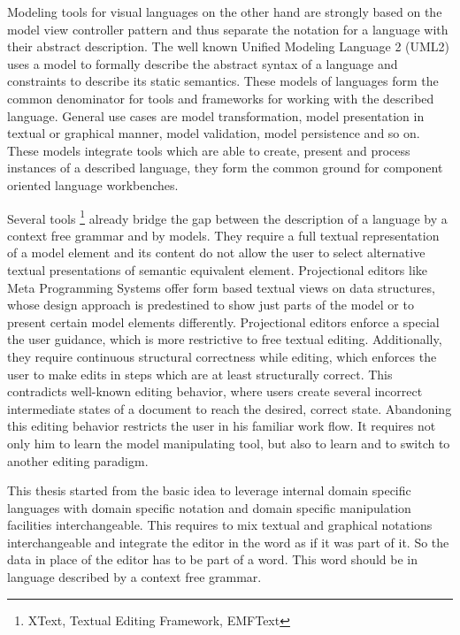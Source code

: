 Modeling tools for visual languages on the other hand are strongly based on the model view controller pattern and thus separate the notation for a language with their abstract description. The well known Unified Modeling Language 2 (UML2) uses a model to formally describe the abstract syntax of a language and constraints to describe its static semantics. These models of languages form the common denominator for tools and frameworks for working with the described language. General use cases are model transformation, model presentation in textual or graphical manner, model validation, model persistence and so on. These models integrate tools which are able to create, present and process instances of a described language, they form the common ground for component oriented language workbenches. 

Several tools \footnote{\raggedright XText, Textual Editing Framework, EMFText} already bridge the gap between the description of a language by a context free grammar and by models. They require a full textual representation of a model element and its content do not allow the user to select alternative textual presentations of semantic equivalent element. Projectional editors like Meta Programming Systems offer form based textual views on data structures, whose design approach is 	 predestined to show just parts of the model or to present certain model elements differently. Projectional editors enforce a special the user guidance, which is more restrictive to free textual editing. Additionally, they require continuous structural correctness while editing, which enforces the user to make edits in steps which are at least structurally correct. This contradicts well-known editing behavior, where users create several incorrect intermediate states of a document to reach the desired, correct state. Abandoning this editing behavior restricts the user in his familiar work flow. It requires not only him to learn the model manipulating tool, but also to learn and to switch to another editing paradigm. 

This thesis started from the basic idea to leverage internal domain specific languages with domain specific notation and domain specific manipulation facilities interchangeable. This requires to mix textual and graphical notations interchangeable and integrate the editor in the word as if it was part of it. So the data in place of the editor has to be part of a word. This word should be in language described by a context free grammar.
 
